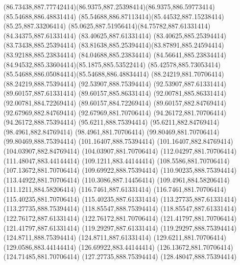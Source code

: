 {{	\curveto(86.73438,887.77742414)(86.9375,887.25398414)(86.9375,886.59773414)
	\closepath
	\moveto(85.54688,886.48831414)
	\curveto(85.54688,886.87113414)(85.44532,887.15238414)(85.25,887.33206414)
	\curveto(85.0625,887.51956414)(84.75782,887.61331414)(84.34375,887.61331414)
	\lineto(83.40625,887.61331414)
	\lineto(83.40625,885.25394414)
	\lineto(83.73438,885.25394414)
	\curveto(83.81638,885.25394414)(83.87891,885.24594414)(83.92188,885.23834414)
	\lineto(84.04688,885.23834414)
	\curveto(84.56641,885.23834414)(84.94532,885.33604414)(85.1875,885.53522414)
	\curveto(85.42578,885.73053414)(85.54688,886.05084414)(85.54688,886.48834414)
	\closepath
	\moveto(88.24219,881.70706414)
	\lineto(88.24219,888.75394414)
	\lineto(92.53907,888.75394414)
	\lineto(92.53907,887.61331414)
	\lineto(89.60157,887.61331414)
	\lineto(89.60157,885.86331414)
	\lineto(92.00781,885.86331414)
	\lineto(92.00781,884.72269414)
	\lineto(89.60157,884.72269414)
	\lineto(89.60157,882.84769414)
	\lineto(92.67969,882.84769414)
	\lineto(92.67969,881.70706414)
	\closepath
	\moveto(94.26172,881.70706414)
	\lineto(94.26172,888.75394414)
	\lineto(95.6211,888.75394414)
	\lineto(95.6211,882.84769414)
	\lineto(98.4961,882.84769414)
	\lineto(98.4961,881.70706414)
	\closepath
	\moveto(99.80469,881.70706414)
	\lineto(99.80469,888.75394414)
	\lineto(101.16407,888.75394414)
	\lineto(101.16407,882.84769414)
	\lineto(104.03907,882.84769414)
	\lineto(104.03907,881.70706414)
	\closepath
	\moveto(112.04297,881.70706414)
	\lineto(111.48047,883.44144414)
	\lineto(109.1211,883.44144414)
	\lineto(108.5586,881.70706414)
	\lineto(107.13672,881.70706414)
	\lineto(109.69922,888.75394414)
	\lineto(110.90235,888.75394414)
	\lineto(113.44922,881.70706414)
	\closepath
	\moveto(110.3086,887.14456414)
	\lineto(109.4961,884.58206414)
	\lineto(111.1211,884.58206414)
	\closepath
	\moveto(116.7461,887.61331414)
	\lineto(116.7461,881.70706414)
	\lineto(115.40235,881.70706414)
	\lineto(115.40235,887.61331414)
	\lineto(113.27735,887.61331414)
	\lineto(113.27735,888.75394414)
	\lineto(118.85547,888.75394414)
	\lineto(118.85547,887.61331414)
	\closepath
	\moveto(122.76172,887.61331414)
	\lineto(122.76172,881.70706414)
	\lineto(121.41797,881.70706414)
	\lineto(121.41797,887.61331414)
	\lineto(119.29297,887.61331414)
	\lineto(119.29297,888.75394414)
	\lineto(124.8711,888.75394414)
	\lineto(124.8711,887.61331414)
	\closepath
	\moveto(129.6211,881.70706414)
	\lineto(129.0586,883.44144414)
	\lineto(126.69922,883.44144414)
	\lineto(126.13672,881.70706414)
	\lineto(124.71485,881.70706414)
	\lineto(127.27735,888.75394414)
	\lineto(128.48047,888.75394414)
}}
